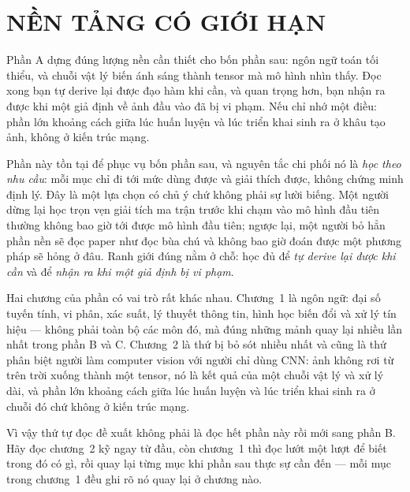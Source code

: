 \documentclass[../deep_learning.tex]{subfiles}
\begin{document}
\part{NỀN TẢNG CÓ GIỚI HẠN}
\begin{tomtat}
Phần A dựng đúng lượng nền cần thiết cho bốn phần sau: ngôn ngữ toán tối thiểu, và chuỗi vật lý biến ánh sáng thành tensor mà mô hình nhìn thấy. Đọc xong bạn tự derive lại được đạo hàm khi cần, và quan trọng hơn, bạn nhận ra được khi một giả định về ảnh đầu vào đã bị vi phạm. Nếu chỉ nhớ một điều: phần lớn khoảng cách giữa lúc huấn luyện và lúc triển khai sinh ra ở khâu tạo ảnh, không ở kiến trúc mạng.
\end{tomtat}

Phần này tồn tại để phục vụ bốn phần sau, và nguyên tắc chi phối nó là \emph{học theo nhu cầu}: mỗi mục chỉ đi tới mức dùng được và giải thích được, không chứng minh định lý. Đây là một lựa chọn có chủ ý chứ không phải sự lười biếng. Một người dừng lại học trọn vẹn giải tích ma trận trước khi chạm vào mô hình đầu tiên thường không bao giờ tới được mô hình đầu tiên; ngược lại, một người bỏ hẳn phần nền sẽ đọc paper như đọc bùa chú và không bao giờ đoán được một phương pháp sẽ hỏng ở đâu. Ranh giới đúng nằm ở chỗ: học đủ để \emph{tự derive lại được khi cần} và để \emph{nhận ra khi một giả định bị vi phạm}.

Hai chương của phần có vai trò rất khác nhau. Chương~1 là ngôn ngữ: đại số tuyến tính, vi phân, xác suất, lý thuyết thông tin, hình học biến đổi và xử lý tín hiệu --- không phải toàn bộ các môn đó, mà đúng những mảnh quay lại nhiều lần nhất trong phần B và C. Chương~2 là thứ bị bỏ sót nhiều nhất và cũng là thứ phân biệt người làm computer vision với người chỉ dùng CNN: ảnh không rơi từ trên trời xuống thành một tensor, nó là kết quả của một chuỗi vật lý và xử lý dài, và phần lớn khoảng cách giữa lúc huấn luyện và lúc triển khai sinh ra ở chuỗi đó chứ không ở kiến trúc mạng.

Vì vậy thứ tự đọc đề xuất không phải là đọc hết phần này rồi mới sang phần B. Hãy đọc chương~2 kỹ ngay từ đầu, còn chương~1 thì đọc lướt một lượt để biết trong đó có gì, rồi quay lại từng mục khi phần sau thực sự cần đến --- mỗi mục trong chương~1 đều ghi rõ nó quay lại ở chương nào.



\ifSubfilesClassLoaded{\printbibliography[title={Nguồn}]}{}
\end{document}
